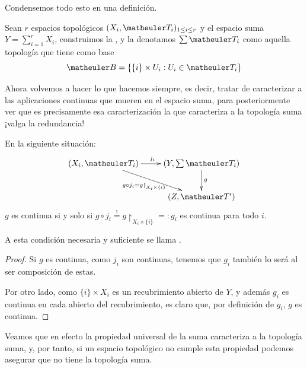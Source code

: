 Condensemos todo esto en una definición.
\begin{defi}
	Sean $r$ espacios topológicos $(X_i, \T_i)_{1\le i \le r}$ y el espacio suma $Y=\sum_{i=1}^rX_i$, construimos la , y la denotamos $\sum\T_i$ como aquella topología que tiene como base \[\B=\{\{i\}\times U_i:U_i\in\T_i\}\]
\end{defi}

Ahora volvemos a hacer lo que hacemos siempre, es decir, tratar de caracterizar a las aplicaciones continuas que mueren en el espacio suma, para posteriormente ver que es precisamente esa caracterización la que caracteriza a la topología suma ¡valga la redundancia!

\begin{lem}
	En la siguiente situación:
	\[\xymatrix{
		(X_i,\T_i)\ar[r]^{j_i} \ar[rd]_{g\circ j_i = g\restriction_{X_i\times\{i\}}}& (Y,\sum\T_i)\ar[d]^{g}\\
		& (Z,\T')
	}\]
	$g$ es continua si y solo si $g\circ j_i\stackrel{!}{=}g\restriction_{X_i\times\{i\}}=:g_i$ es continua para todo $i$.
	
	A esta condición necesaria y suficiente se llama .
	\begin{proof}
		Si $g$ es continua, como $j_i$ son continuas, tenemos que $g_i$ también lo será al ser composición de estas.
		
		Por otro lado, como $\{i\}\times X_i$ es un recubrimiento abierto de $Y$, y además $g_i$ es continua en cada abierto del recubrimiento, es claro que, por definición de $g_i$, $g$ es continua.
	\end{proof}
\end{lem}

Veamos que en efecto la propiedad universal de la suma caracteriza a la topología suma, y, por tanto, si un espacio topológico no cumple esta propiedad podemos asegurar que no tiene la topología suma.

